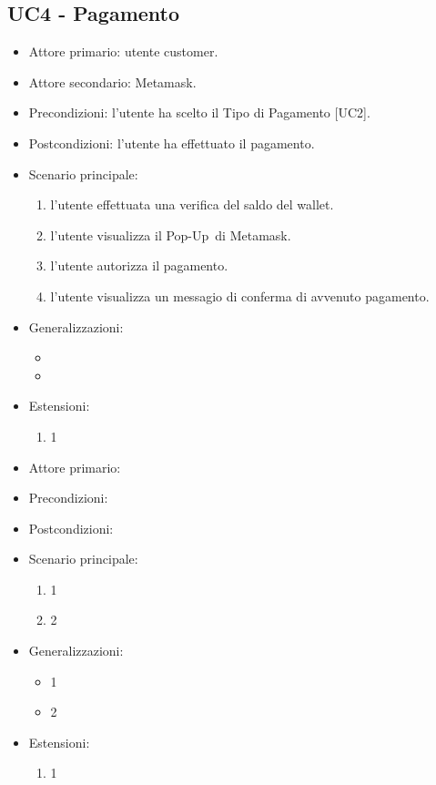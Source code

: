 \subsection{UC4 - Pagamento}

\begin{itemize}
    \item Attore primario: utente customer.
    \item Attore secondario: Metamask.
    \item Precondizioni: l'utente ha scelto il Tipo di Pagamento [UC2].
    \item Postcondizioni: l'utente ha effettuato il pagamento.
    \item Scenario principale: \begin{enumerate}
        \item l'utente effettuata una verifica del saldo del wallet.
        \item l'utente visualizza il Pop-Up\glo\ di Metamask.
        \item l'utente autorizza il pagamento.
        \item l'utente visualizza un messagio di conferma di avvenuto pagamento.
    \end{enumerate}
    \item Generalizzazioni: \begin{itemize}
        \item 
        \item 
    \end{itemize}
    \item Estensioni: \begin{enumerate}
        \item 1
    \end{enumerate}
\end{itemize}



\begin{itemize}
    \item Attore primario:
    \item Precondizioni:
    \item Postcondizioni:
    \item Scenario principale: \begin{enumerate}
        \item 1
        \item 2
    \end{enumerate}
    \item Generalizzazioni: \begin{itemize}
        \item 1
        \item 2
    \end{itemize}
    \item Estensioni: \begin{enumerate}
        \item 1
    \end{enumerate}
\end{itemize}


